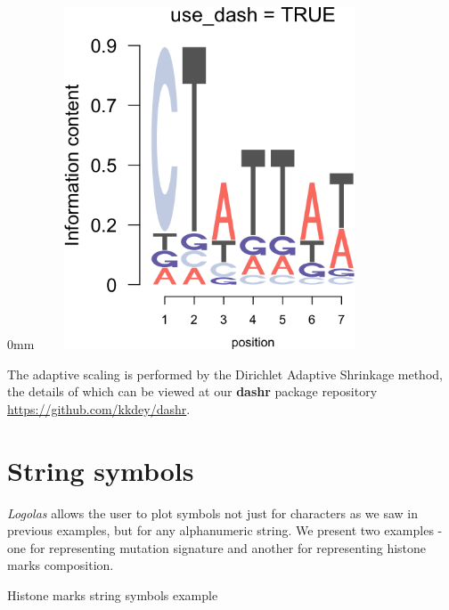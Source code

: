\documentclass[12pt]{article}\usepackage[]{graphicx}\usepackage[usenames,dvipsnames]{color}
\newenvironment{knitrout}{}{} %
\newcommand{\Logolas}{\textit{Logolas}}
\begin{document}
\begin{knitrout}
\begin{adjustwidth}{\fltoffset}{0mm}
\includegraphics[width=4in,height=4in]{figure/dash-2} \hfill{}

\end{adjustwidth}
\end{knitrout}

The adaptive scaling is performed by the Dirichlet Adaptive Shrinkage method, the details of which can be viewed at our \textbf{dashr} package repository \url{https://github.com/kkdey/dashr}.

\section{String symbols}

\Logolas{} allows the user to plot symbols not just for characters as we saw in previous examples, but for any alphanumeric string. We present two examples - one for representing mutation signature and another for representing histone marks composition.

Histone marks string symbols example
\end{document}
